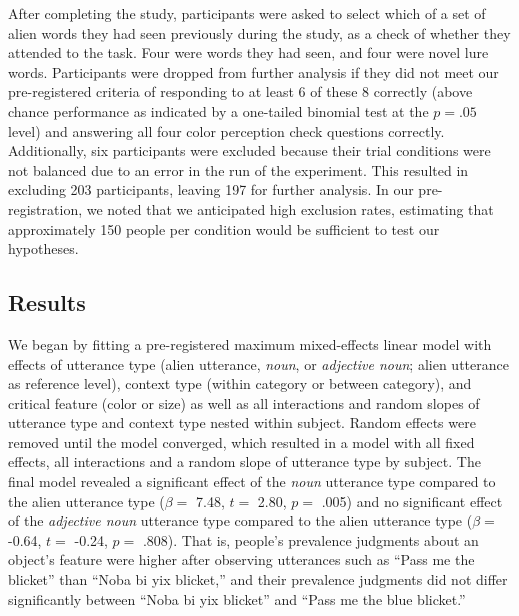 \documentclass[
  english,
  man,floatsintext]{apa6}
\begin{document}
After completing the study, participants were asked to select which of a set of alien words they had seen previously during the study, as a check of whether they attended to the task. Four were words they had seen, and four were novel lure words. Participants were dropped from further analysis if they did not meet our pre-registered criteria of responding to at least 6 of these 8 correctly (above chance performance as indicated by a one-tailed binomial test at the \(p = .05\) level) and answering all four color perception check questions correctly. Additionally, six participants were excluded because their trial conditions were not balanced due to an error in the run of the experiment. This resulted in excluding 203 participants, leaving 197 for further analysis. In our pre-registration, we noted that we anticipated high exclusion rates, estimating that approximately 150 people per condition would be sufficient to test our hypotheses.

\hypertarget{results-2}{%
\subsection{Results}\label{results-2}}

We began by fitting a pre-registered maximum mixed-effects linear model with effects of utterance type (alien utterance, \emph{noun}, or \emph{adjective noun}; alien utterance as reference level), context type (within category or between category), and critical feature (color or size) as well as all interactions and random slopes of utterance type and context type nested within subject. Random effects were removed until the model converged, which resulted in a model with all fixed effects, all interactions and a random slope of utterance type by subject. The final model revealed a significant effect of the \emph{noun} utterance type compared to the alien utterance type (\(\beta =\) 7.48, \(t =\) 2.80, \(p =\) .005) and no significant effect of the \emph{adjective noun} utterance type compared to the alien utterance type (\(\beta =\) -0.64, \(t =\) -0.24, \(p =\) .808). That is, people's prevalence judgments about an object's feature were higher after observing utterances such as ``Pass me the blicket'' than ``Noba bi yix blicket,'' and their prevalence judgments did not differ significantly between ``Noba bi yix blicket'' and ``Pass me the blue blicket.''
\end{document}
